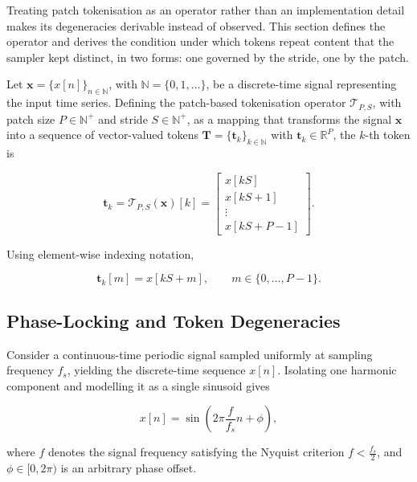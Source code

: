 Treating patch tokenisation as an operator rather than an implementation detail makes its degeneracies derivable instead of observed. This section defines the operator and derives the condition under which tokens repeat content that the sampler kept distinct, in two forms: one governed by the stride, one by the patch.

Let $\mathbf{x} = \lbrace{}x[n]\rbrace_{n \in \mathbb{N}}$, with $\mathbb{N}=\lbrace{}0,1,\ldots\rbrace$, be a discrete-time signal representing the input time series. Defining the patch-based tokenisation operator $\mathcal{T}_{P,S}$, with patch size $P \in \mathbb{N}^{+}$ and stride $S \in \mathbb{N}^{+}$, as a mapping that transforms the signal $\mathbf{x}$ into a sequence of vector-valued tokens $\mathbf{T}=\lbrace{}\mathbf{t}_k\rbrace_{k\in\mathbb{N}}$ with $\mathbf{t}_k\in\mathbb{R}^{P}$, the $k$-th token is

\begin{equation*}
\mathbf{t}_k
=
\mathcal{T}_{P,S}(\mathbf{x})[k]
=
\begin{bmatrix}
x[kS] \\
x[kS+1] \\
\vdots \\
x[kS+P-1]
\end{bmatrix}.
\end{equation*}

Using element-wise indexing notation,

\begin{equation}
\label{eq:element_def}
\mathbf{t}_k[m]
=
x[kS+m],
\qquad
m\in\lbrace{}0,\ldots,P-1\rbrace.
\end{equation}

\subsection{Phase-Locking and Token Degeneracies}
Consider a continuous-time periodic signal sampled uniformly at sampling frequency $f_s$, yielding the discrete-time sequence $x[n]$. Isolating one harmonic component and modelling it as a single sinusoid gives

\begin{equation*}
x[n]
=
\sin\!\left(
2\pi\frac{f}{f_s}n+\phi
\right),
\end{equation*}

where $f$ denotes the signal frequency satisfying the Nyquist criterion $f < \frac{f_s}{2}$, and $\phi\in\lbrack0,2\pi\rparen$ is an arbitrary phase offset.




